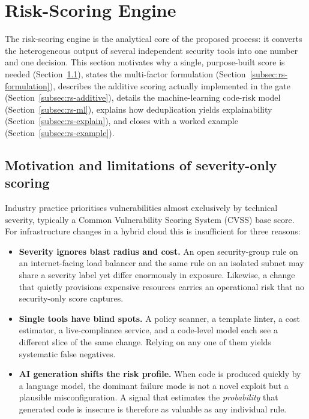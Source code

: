 \section{Risk-Scoring Engine}
\label{sec:risk-scoring}

The risk-scoring engine is the analytical core of the proposed process: it converts the
heterogeneous output of several independent security tools into one number and one
decision. This section motivates why a single, purpose-built score is needed
(Section~\ref{subsec:rs-motivation}), states the multi-factor formulation
(Section~\ref{subsec:rs-formulation}), describes the additive scoring actually
implemented in the gate (Section~\ref{subsec:rs-additive}), details the machine-learning
code-risk model (Section~\ref{subsec:rs-ml}), explains how deduplication yields
explainability (Section~\ref{subsec:rs-explain}), and closes with a worked example
(Section~\ref{subsec:rs-example}).

\subsection{Motivation and limitations of severity-only scoring}
\label{subsec:rs-motivation}

Industry practice prioritises vulnerabilities almost exclusively by technical severity,
typically a Common Vulnerability Scoring System (CVSS) base score. For infrastructure
changes in a hybrid cloud this is insufficient for three reasons:

\begin{itemize}
    \item \textbf{Severity ignores blast radius and cost.} An open security-group rule on
    an internet-facing load balancer and the same rule on an isolated subnet may share a
    severity label yet differ enormously in exposure. Likewise, a change that quietly
    provisions expensive resources carries an operational risk that no security-only
    score captures.
    \item \textbf{Single tools have blind spots.} A policy scanner, a template linter, a
    cost estimator, a live-compliance service, and a code-level model each see a
    different slice of the same change. Relying on any one of them yields systematic
    false negatives.
    \item \textbf{AI generation shifts the risk profile.} When code is produced quickly
    by a language model, the dominant failure mode is not a novel exploit but a plausible
    misconfiguration. A signal that estimates the \emph{probability} that generated code
    is insecure is therefore as valuable as any individual rule.
\end{itemize}

